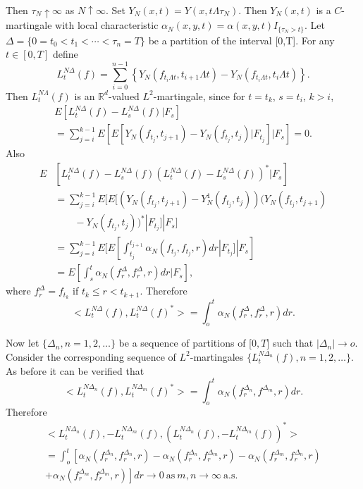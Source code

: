  
 Then $\tau_N \uparrow \infty $  as $N \uparrow \infty$. Set $Y_N(x,
 t)=Y(x, t \Lambda \tau _N)$. Then $Y_N(x, t)$ is a $C$-martingale
 with local characteristic $\alpha_N(x, y, t)=\alpha(x,y,t)I_{\{\tau_N
   >t\}}$.  Let $\Delta = \{0 =t_0 < t_1 < \cdots < \tau_n =T\}$ be a
 partition of the interval [0,T]. For any $t \in [0,T]$ define 
 \begin{equation*}
   L^{N \Delta}_t(f)=\sum^{n-1}_{i=0}\left\{Y_N(f_{t_i \Lambda
     t},t_{i+1}\Lambda t)-Y_N(f_{t_i \Lambda t},t_i \Lambda
   t)\right\}. \tag{2.3.2}\label{c2:eq2.3.2}  
 \end{equation*} 
 Then $L^{N \Lambda}_t(f)$ is an $\mathbb{R}^d$-valued
 $L^2$-martingale, since for $t=t_k$, $s=t_i$, $k>i$, 
 \begin{multline*}
 E\left[L^{N \Delta}_t (f)-L^{N \Delta}_s(f)|F_s\right]\\ 
 = \sum^{k-1}_{j=i}E
 \left[E\left[Y_N(f_{t_j},t_{j+1})-Y_N(f_{t_j},t_{j})|F_{t_j}\right]|F_s
   \right]=0.     
 \end{multline*}\pageoriginale
 Also
 \begin{align*}
   E &\left[L^{N \Delta}_t (f)-L^{N \Delta}_s(f)(L_t^{N \Delta}(f)-L^{N
       \Delta}_s(f))^*|F_s\right]\\ 
   & = \sum^
   {k-1}_{j=i}E[E[(Y_N(f_{t_j},t_{j+1}) - Y^1_N(f_{t_j},t_{j}))
       (Y_N(f_{t_j}, t_{j+1})\\
  &\qquad-Y_N(f_{t_j},t_j))^\ast|F_{t_j}]|F_s]\\  
   & = \sum^ {k-1}_{j=i}E[E[\int ^{t_{j+1}}_{t_j}\alpha_N(
       f_{t_j},f_{t_j},r)dr|F_{t_j}]|F_s]\\ 
   & = E[\int^t_s \alpha_N(f^\Delta_r,f^\Delta_r,r)dr|F_s],
 \end{align*} 
 where $f^\Delta_r =f_{t_k}$ if $t_k \leq r < t_{k+1}$. Therefore
 \begin{equation*}
   < L^{N \Delta}_t(f), L^{N \Delta}_t(f)^* > = \int^t_o
   \alpha_N(f^\Delta_r, f^\Delta_r,r)dr. \tag{2.3.3}\label{c2:eq2.3.3} 
 \end{equation*}  
 
 Now let $\{\Delta_n,n=1,2, \ldots\}$ be a sequence of partitions of
 [$0,T$] such that $|\Delta_n| \to o$. 
 Consider the corresponding sequence of $L^2$-martingales $\{L^{N
   \Delta_n}_{t} (f), n=1,2,\ldots\}$. As before it can be verified
 that 
 $$ 
 < L^{N \Delta_n}_{t} (f), L^{N \Delta_m}_{t}(f)^*> = \int^t_o
 \alpha_N (f^{\Delta_n}_r, f^{\Delta_m}, r)dr. 
 $$
 Therefore 
\begin{multline*}
  < L^{N \Delta_n}_{t} (f), -L^{N \Delta_m}_{t}(f),( L^{N \Delta_n}_{t}
  (f), -L^{N \Delta_m}_{t}(f))^*>\\ 
  = \int^t_o \left[\alpha_N \left(f^{\Delta_n}_r,f^{\Delta_n}_r,r
    \right)-\alpha_N\left(f^{\Delta_n}_r,f^{\Delta_m}_r, r\right)
    - \alpha_N\left(f^{\Delta_m}_r,f^{\Delta_n}_r,r\right)\right.\\ 
    \left.+\alpha_N\left(f^{\Delta_m}_r,f^{\Delta_m}_r,r\right)\right]dr
  \to 0 ~\text{as}~ m,n \to \infty ~\text{a.s.}\\
\end{multline*}
  
